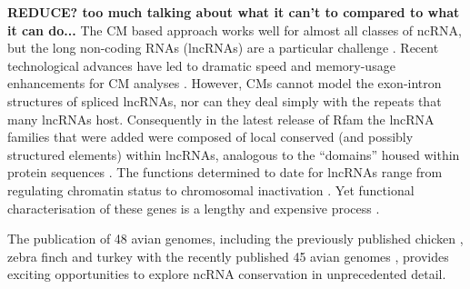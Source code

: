 \documentclass[10pt]{bmc_article}
\newenvironment{bmcformat}{\begin{raggedright}\baselineskip20pt\sloppy\setboolean{publ}{false}}{\end{raggedright}\baselineskip20pt\sloppy}
\begin{document}
\begin{bmcformat}
{\bf REDUCE? too much talking about what it can't to compared to what it can do...}
The CM based approach works well for almost all classes of ncRNA, but
the long non-coding RNAs (lncRNAs) are a particular challenge
\cite{Guttman:2009}. Recent technological advances have led to
dramatic speed and memory-usage enhancements for CM analyses
\cite{Eddy:2002,Nawrocki:2007,Nawrocki:2009,Eddy:2011}. However, CMs
cannot model the exon-intron structures of spliced lncRNAs, nor can
they deal simply with the repeats that many lncRNAs host. Consequently
in the latest release of Rfam the lncRNA families that were added were
composed of local conserved (and possibly structured elements) within
lncRNAs, analogous to the ``domains'' housed within protein sequences
\cite{Burge:2013}. The functions determined to date for lncRNAs range
from regulating chromatin status to chromosomal inactivation
\cite{Rinn:2007,Chow:2005}. Yet functional characterisation of these
genes is a lengthy and expensive process \cite{Guttman:2009}.

The publication of 48 avian genomes, including the previously
published chicken
\cite{International_Chicken_Genome_Sequencing_Consortium:2004}, zebra
finch \cite{Warren:2010} and turkey \cite{Dalloul:2010} with the recently
published 45 avian genomes \cite{birds:14,birds:14a,Huang:2013,Zhan:2013,Shapiro:2013,Howard:2013,Li:2014}, provides
exciting opportunities to explore ncRNA conservation in
unprecedented detail. 


\end{bmcformat}
\end{document}
